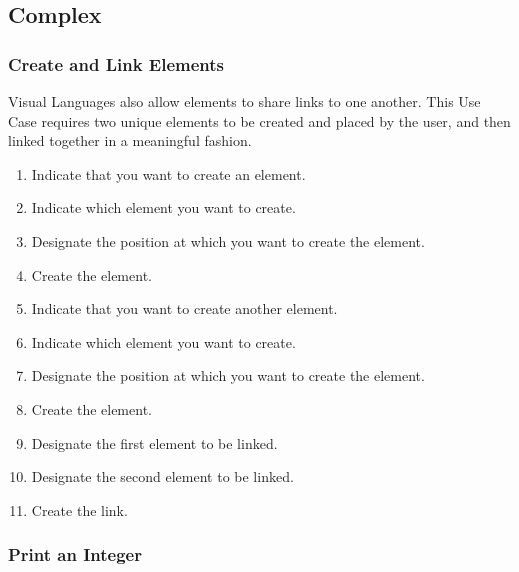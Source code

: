 \subsection{Complex}
\label{app:complex_euc}

\subsubsection{Create and Link Elements}
\label{app:euc_create_link}

Visual Languages also allow elements to share links to one another. This
Use Case requires two unique elements to be created and placed by the user,
and then linked together in a meaningful fashion.

\begin{enumerate}
  \item Indicate that you want to create an element.
  \item Indicate which element you want to create.
  \item Designate the position at which you want to create the element.
  \item Create the element.
  \item Indicate that you want to create another element.
  \item Indicate which element you want to create.
  \item Designate the position at which you want to create the element.
  \item Create the element.
  \item Designate the first element to be linked.
  \item Designate the second element to be linked.
  \item Create the link.
\end{enumerate}

\subsubsection{Print an Integer}
\label{app:euc_print_integer}

